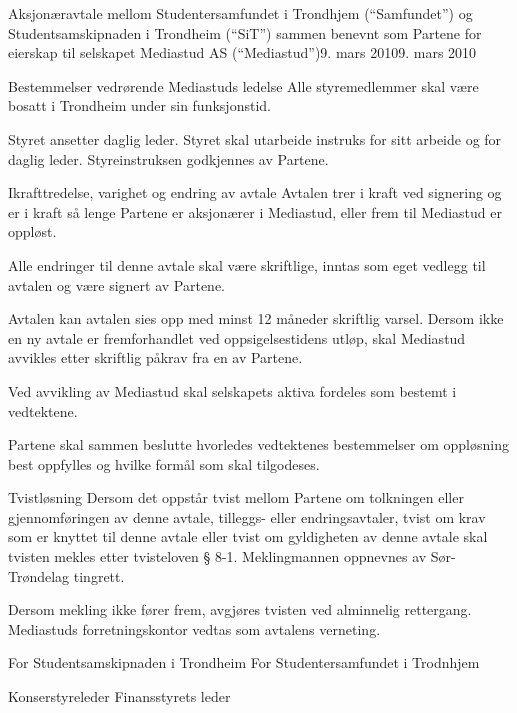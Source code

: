 \begin{instruks}{Aksjonæravtale mellom Studentersamfundet i Trondhjem
(``Samfundet'') og
Studentsamskipnaden i Trondheim (``SiT'') sammen benevnt som Partene for
eierskap til selskapet Mediastud AS (``Mediastud'')}{9. mars 2010}{9. mars 2010}
\begin{instruksledd}{Bestemmelser vedrørende Mediastuds ledelse}
		Alle styremedlemmer skal være bosatt i Trondheim under sin
		funksjonstid.

		Styret ansetter daglig leder. Styret skal utarbeide instruks for
		sitt arbeide og for daglig leder. Styreinstruksen godkjennes av
		Partene.
	\end{instruksledd}

	\begin{instruksledd}{Ikrafttredelse, varighet og endring av avtale}
	Avtalen trer i kraft ved signering og er i kraft så lenge Partene er aksjonærer
	i Mediastud, eller frem til Mediastud er oppløst. 

	Alle endringer til denne avtale skal være skriftlige, inntas som eget vedlegg
	til avtalen og være signert av Partene. 

	Avtalen kan avtalen sies opp med minst 12 måneder skriftlig varsel.
	Dersom ikke en ny avtale er fremforhandlet ved oppsigelsestidens utløp, skal
	Mediastud avvikles etter skriftlig påkrav fra en av Partene.

	Ved avvikling av Mediastud skal selskapets aktiva fordeles som bestemt i
	vedtektene.

	Partene skal sammen beslutte hvorledes vedtektenes bestemmelser om oppløsning
	best oppfylles og hvilke formål som skal tilgodeses.
	\end{instruksledd}

	\begin{instruksledd}{Tvistløsning}
	Dersom det oppstår tvist mellom Partene om tolkningen eller
	gjennomføringen av denne avtale, tilleggs- eller endringsavtaler, tvist
	om krav som er knyttet til denne avtale eller tvist om gyldigheten av
	denne avtale skal tvisten mekles etter tvisteloven § 8-1. Meklingmannen
	oppnevnes av Sør-Trøndelag tingrett.   

	Dersom mekling ikke fører frem, avgjøres tvisten ved alminnelig
	rettergang. Mediastuds forretningskontor vedtas som avtalens verneting.
	\end{instruksledd}

	\vfill
For Studentsamskipnaden i Trondheim 	\hfill	For Studentersamfundet i Trodnhjem

Konserstyreleder \hfill		Finansstyrets leder


\end{instruks}

